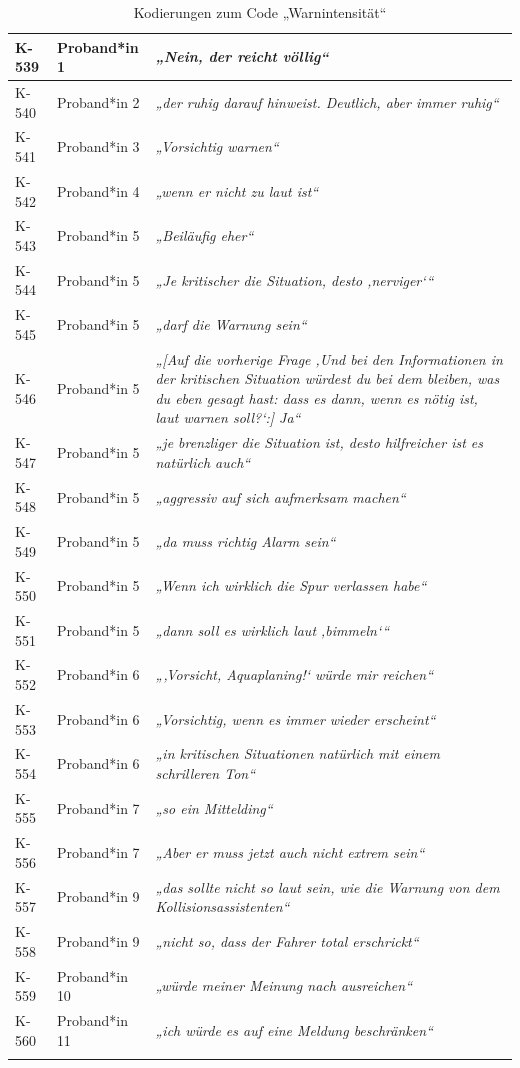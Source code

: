 {\begin{xltabular}{\textwidth}{
    |P{0.10\textwidth}
    |P{0.17\textwidth}
    |Y|
}
K-539 & Proband*in 1 & \textit{„Nein, der reicht völlig“} \\
\hline
K-540 & Proband*in 2 & \textit{„der ruhig darauf hinweist. Deutlich, aber immer ruhig“} \\
\hline
K-541 & Proband*in 3 & \textit{„Vorsichtig warnen“} \\
\hline
K-542 & Proband*in 4 & \textit{„wenn er nicht zu laut ist“} \\
\hline
K-543 & Proband*in 5 & \textit{„Beiläufig eher“} \\
\hline
K-544 & Proband*in 5 & \textit{„Je kritischer die Situation, desto ‚nerviger‘“} \\
\hline
K-545 & Proband*in 5 & \textit{„darf die Warnung sein“} \\
\hline
K-546 & Proband*in 5 & \textit{„[Auf die vorherige Frage ‚Und bei den Informationen in der kritischen Situation würdest du bei dem bleiben, was du eben gesagt hast: dass es dann, wenn es nötig ist, laut warnen soll?‘:] Ja“} \\
\hline
K-547 & Proband*in 5 & \textit{„je brenzliger die Situation ist, desto hilfreicher ist es natürlich auch“} \\
\hline
K-548 & Proband*in 5 & \textit{„aggressiv auf sich aufmerksam machen“} \\
\hline
K-549 & Proband*in 5 & \textit{„da muss richtig Alarm sein“} \\
\hline
K-550 & Proband*in 5 & \textit{„Wenn ich wirklich die Spur verlassen habe“} \\
\hline
K-551 & Proband*in 5 & \textit{„dann soll es wirklich laut ‚bimmeln‘“} \\
\hline
K-552 & Proband*in 6 & \textit{„‚Vorsicht, Aquaplaning!‘ würde mir reichen“} \\
\hline
K-553 & Proband*in 6 & \textit{„Vorsichtig, wenn es immer wieder erscheint“} \\
\hline
K-554 & Proband*in 6 & \textit{„in kritischen Situationen natürlich mit einem schrilleren Ton“} \\
\hline
K-555 & Proband*in 7 & \textit{„so ein Mittelding“} \\
\hline
K-556 & Proband*in 7 & \textit{„Aber er muss jetzt auch nicht extrem sein“} \\
\hline
K-557 & Proband*in 9 & \textit{„das sollte nicht so laut sein, wie die Warnung von dem Kollisionsassistenten“} \\
\hline
K-558 & Proband*in 9 & \textit{„nicht so, dass der Fahrer total erschrickt“} \\
\hline
K-559 & Proband*in 10 & \textit{„würde meiner Meinung nach ausreichen“} \\
\hline
K-560 & Proband*in 11 & \textit{„ich würde es auf eine Meldung beschränken“} \\
\hline
\caption{Kodierungen zum Code „Warnintensität“}\label{tab:kodiernachweis-warnintensitaet}\\
\end{xltabular}
}

